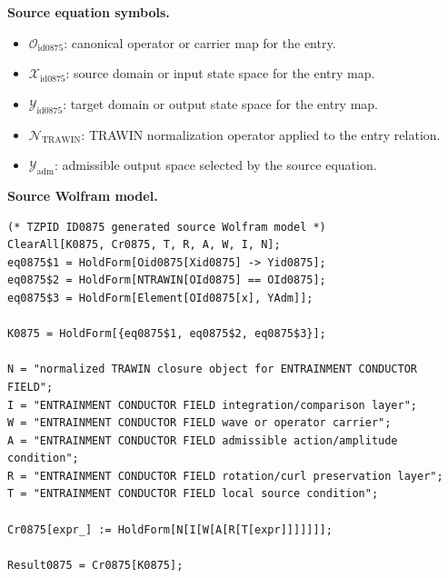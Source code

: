 \begin{minipage}[t]{0.49\linewidth}
\begingroup
\small
\raggedright
\textbf{Source equation symbols.}\par
\begin{itemize}[leftmargin=1.35em,itemsep=1pt,topsep=1pt,parsep=0pt]
    \item $\mathcal{O}_{\mathrm{id0875}}$: canonical operator or carrier map for the entry.
    \item $\mathcal{X}_{\mathrm{id0875}}$: source domain or input state space for the entry map.
    \item $\mathcal{Y}_{\mathrm{id0875}}$: target domain or output state space for the entry map.
    \item $\mathcal{N}_{\mathrm{TRAWIN}}$: TRAWIN normalization operator applied to the entry relation.
    \item $\mathcal{Y}_{\mathrm{adm}}$: admissible output space selected by the source equation.
\end{itemize}
\endgroup
\end{minipage}\hfill
\begin{minipage}[t]{0.47\linewidth}
\begingroup
\scriptsize
\raggedright
\textbf{Source Wolfram model.}\par
\begin{Verbatim}[fontsize=\tiny,breaklines=true,breakanywhere=true]
(* TZPID ID0875 generated source Wolfram model *)
ClearAll[K0875, Cr0875, T, R, A, W, I, N];
eq0875$1 = HoldForm[Oid0875[Xid0875] -> Yid0875];
eq0875$2 = HoldForm[NTRAWIN[OId0875] == OId0875];
eq0875$3 = HoldForm[Element[OId0875[x], YAdm]];

K0875 = HoldForm[{eq0875$1, eq0875$2, eq0875$3}];

N = "normalized TRAWIN closure object for ENTRAINMENT CONDUCTOR FIELD";
I = "ENTRAINMENT CONDUCTOR FIELD integration/comparison layer";
W = "ENTRAINMENT CONDUCTOR FIELD wave or operator carrier";
A = "ENTRAINMENT CONDUCTOR FIELD admissible action/amplitude condition";
R = "ENTRAINMENT CONDUCTOR FIELD rotation/curl preservation layer";
T = "ENTRAINMENT CONDUCTOR FIELD local source condition";

Cr0875[expr_] := HoldForm[N[I[W[A[R[T[expr]]]]]]];

Result0875 = Cr0875[K0875];
\end{Verbatim}
\endgroup
\end{minipage}

